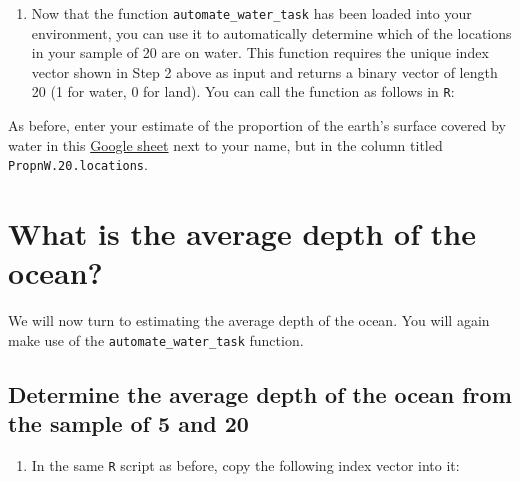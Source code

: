 \documentclass[letterpaper,10pt,twoside,]{pinp}
\providecommand{\tightlist}{%
  \setlength{\itemsep}{0pt}\setlength{\parskip}{0pt}}
\begin{document}
\begin{enumerate}
\def\labelenumi{\arabic{enumi}.}
\setcounter{enumi}{3}
\tightlist
\item
  Now that the function \texttt{automate\_water\_task} has been loaded
  into your environment, you can use it to automatically determine which
  of the locations in your sample of 20 are on water. This function
  requires the unique index vector shown in Step 2 above as input and
  returns a binary vector of length 20 (1 for water, 0 for land). You
  can call the function as follows in \texttt{R}:
\end{enumerate}

\begin{Shaded}
\begin{Highlighting}[]
\StringTok{ }\NormalTok{(}\NormalTok{)}
\end{Highlighting}
\end{Shaded}

As before, enter your estimate of the proportion of the earth's surface
covered by water in this
\href{https://docs.google.com/spreadsheets/d/1Mnxeq9nQcTdQycZ7S_62fYFiNC5_a3fibsyodzfwO58/edit?usp=sharing}{Google
sheet} next to your name, but in the column titled
\texttt{PropnW.20.locations}.

\hypertarget{what-is-the-average-depth-of-the-ocean}{%
\section{What is the average depth of the
ocean?}\label{what-is-the-average-depth-of-the-ocean}}

We will now turn to estimating the average depth of the ocean. You will
again make use of the \texttt{automate\_water\_task} function.

\hypertarget{determine-the-average-depth-of-the-ocean-from-the-sample-of-5-and-20}{%
\subsection{Determine the average depth of the ocean from the sample of
5 and
20}\label{determine-the-average-depth-of-the-ocean-from-the-sample-of-5-and-20}}

\begin{enumerate}
\def\labelenumi{\arabic{enumi}.}
\tightlist
\item
  In the same \texttt{R} script as before, copy the following index
  vector into it:
\end{enumerate}
\end{document}
